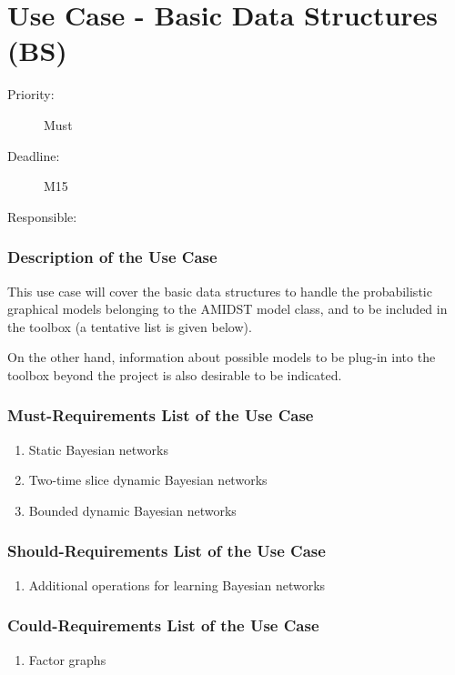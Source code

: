 \newpage
\section{Use Case - Basic Data Structures (BS)}
\label{UseCase:BS}

\begin{description}
\item[Priority:] Must
\item[Deadline:] M15
\item[Responsible:] 
\end{description}

\subsubsection*{Description of the Use Case}

This use case will cover the basic data structures to handle the probabilistic graphical models belonging to the AMIDST model class, and to be included in the toolbox (a tentative list is given below).

On the other hand, information about possible models to be plug-in into the toolbox beyond the project is also desirable to be indicated.  


\subsubsection*{Must-Requirements List of the Use Case}

\begin{enumerate}
\item Static Bayesian networks
\item Two-time slice dynamic Bayesian networks
\item Bounded dynamic Bayesian networks
\end{enumerate}

\subsubsection*{Should-Requirements List of the Use Case}

\begin{enumerate}
\item Additional operations for learning Bayesian networks
\end{enumerate}

\subsubsection*{Could-Requirements List of the Use Case}

\begin{enumerate}
\item Factor graphs
\end{enumerate}